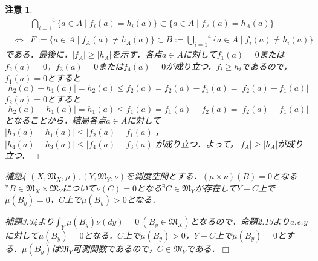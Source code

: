 \documentclass[a4paper,11pt]{jsarticle}
\def\qed{\hfill $\Box$}
\newtheorem{attention}{注意}
\begin{document}
\begin{attention}
\begin{eqnarray*}
&&\overset{4}{\underset{i=1}{\bigcap}}\{a\in A \mid f_i(a)=h_i(a)\} \subset \{a\in A \mid f_A(a)=h_A(a)\} \\
&\Longleftrightarrow&F:=\{a\in A \mid f_A(a)\neq h_A(a)\} \subset B:=\overset{4}{\underset{i=1}{\bigcup}}\{a\in A \mid f_i(a)\neq h_i(a)\}
\end{eqnarray*}
である．最後に，$|f_A|\geq |h_A|$を示す．各点$a\in A$に対して$f_1(a)=0$または$f_2(a)=0$，$f_3(a)=0$または$f_4(a)=0$が成り立つ．$f_i\geq h_i$であるので，$f_1(a)=0$とすると
\begin{equation*}
|h_2(a)-h_1(a)|=h_2(a)\leq f_2(a)=f_2(a)-f_1(a)=|f_2(a)-f_1(a)|
\end{equation*}
$f_2(a)=0$とすると
\begin{equation*}
|h_2(a)-h_1(a)|=h_1(a)\leq f_1(a)=f_1(a)-f_2(a)=|f_2(a)-f_1(a)|
\end{equation*}
となることから，結局各点$a\in A$に対して$|h_2(a)-h_1(a)|\leq |f_2(a)-f_1(a)|$，$|h_4(a)-h_3(a)|\leq |f_4(a)-f_3(a)|$が成り立つ．よって，$|f_A|\geq |h_A|$が成り立つ．\qed
\begin{itembox}[l]{補題4}
$(X,\mathfrak{M}_X,\mu ),(Y,\mathfrak{M}_Y,\nu )$を測度空間とする．$(\mu\times\nu)(B)=0$となる$^\forall B\in\mathfrak{M}_X\times\mathfrak{M}_Y$について$\nu(C)=0$となる$^\exists C\in\mathfrak{M}_Y$が存在して$Y-C$上で$\mu(B_y)=0$，$C$上で$\mu(B_y)>0$となる．
\end{itembox}
補題3.34より$\int_Y\mu(B_y)\nu(dy)=0{\ }(B_y\in \mathfrak{M}_X)$となるので，命題2.13よりa.e.yに対して$\mu(B_y)=0$となる．$C$上で$\mu(B_y)>0$，$Y-C$上で$\mu(B_y)=0$とする．$\mu(B_y)$は$\mathfrak{M}_Y$可測関数であるので，$C\in\mathfrak{M}_Y$である．\qed
\end{attention}
\end{document}
